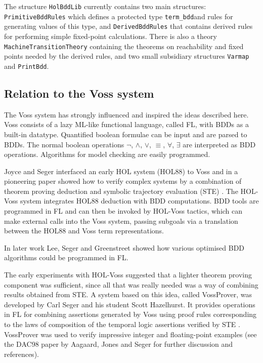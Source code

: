 \documentclass[12pt,fleqn]{article}
\renewcommand{\t}[1]{\mbox{\tt #1}}
\newcommand\termbddty{\texttt{term\_bdd}{}}
\begin{document}
The structure \t{HolBddLib} currently contains two main structures: \t{PrimitiveBddRules}
which defines a protected type \termbddty and rules for generating
values of this type, and \t{DerivedBddRules} that contains derived
rules for performing simple fixed-point calculations.  There is also a
theory \t{MachineTransitionTheory} containing the theorems on
reachability and fixed points needed by the derived rules,
and two small subsidiary structures \t{Varmap} and \t{PrintBdd}.


\subsection{Relation to the Voss system}\label{related}

The Voss system \cite{SegerVoss} has strongly influenced and inspired
the ideas described here. Voss consists of a lazy
ML-like functional language, called FL, with BDDs as a built-in datatype.
Quantified boolean formulae can be input and are parsed to BDDs.
The normal boolean operations $\neg$, $\wedge$, $\vee$, $\equiv$,
$\forall$, $\exists$ are interpreted as BDD operations.
Algorithms for model checking are easily programmed.

Joyce and Seger interfaced an early HOL system (HOL88) to Voss and in
a pioneering paper showed how to verify complex systems by a
combination of theorem proving deduction and symbolic trajectory
evaluation (STE) \cite{JoyceSeger}. The HOL-Voss system integrates HOL88
deduction with BDD computations.  BDD tools are programmed in FL and
can then be invoked by HOL-Voss tactics, which can make external
calls into the Voss system, passing subgoals via a translation between
the HOL88 and Voss term representations.

In later work Lee, Seger and Greenstreet \cite{LeeGreenstreetSeger}
showed how various optimised BDD algorithms could be programmed in FL.

The early experiments with HOL-Voss suggested that a lighter theorem
proving component was sufficient, since all that was really needed was
a way of combining results obtained from STE. A system based on this
idea, called VossProver, was developed by Carl Seger and his student
Scott Hazelhurst. It provides operations in FL for combining
assertions generated by Voss using proof rules corresponding to the
laws of composition of the temporal logic assertions verified by STE
\cite{hazelhurst-kropfbook-97}.
VossProver was used to verify
impressive integer and floating-point examples (see the DAC98
paper by Aagaard, Jones and Seger \cite{aagaard-dac-98} for further
discussion and references).
\end{document}
